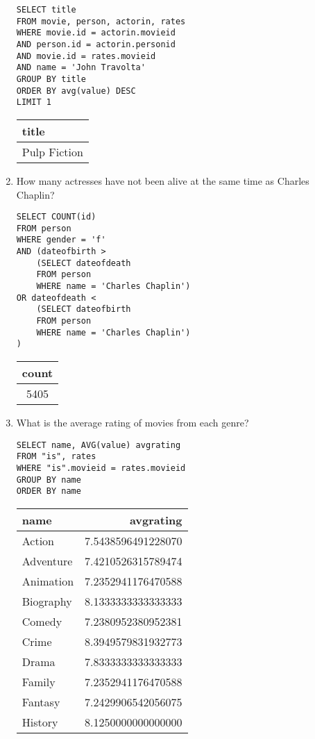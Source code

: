 \begin{enumerate}
\begin{lstlisting}
SELECT title
FROM movie, person, actorin, rates
WHERE movie.id = actorin.movieid
AND person.id = actorin.personid
AND movie.id = rates.movieid
AND name = 'John Travolta'
GROUP BY title
ORDER BY avg(value) DESC
LIMIT 1
\end{lstlisting}

\begin{tabular}{|l|}
\hline
title \\ \hline
Pulp Fiction \\ \hline
\end{tabular}

\item How many actresses have not been alive at the same time as Charles Chaplin?

\begin{lstlisting}
SELECT COUNT(id)
FROM person
WHERE gender = 'f'
AND (dateofbirth > 
	(SELECT dateofdeath
	FROM person
	WHERE name = 'Charles Chaplin')
OR dateofdeath <
	(SELECT dateofbirth
	FROM person
	WHERE name = 'Charles Chaplin')
)
\end{lstlisting}

\begin{tabular}{|c|}
\hline
count \\ \hline
5405 \\ \hline
\end{tabular}

\item What is the average rating of movies from each genre?

\begin{lstlisting}
SELECT name, AVG(value) avgrating
FROM "is", rates
WHERE "is".movieid = rates.movieid
GROUP BY name
ORDER BY name
\end{lstlisting}

\begin{tabular}{|l|r|}
\hline
name & avgrating \\ \hline
Action & 7.5438596491228070 \\ \hline
Adventure & 7.4210526315789474 \\ \hline
Animation & 7.2352941176470588 \\ \hline
Biography & 8.1333333333333333 \\ \hline
Comedy & 7.2380952380952381 \\ \hline
Crime & 8.3949579831932773 \\ \hline
Drama & 7.8333333333333333 \\ \hline
Family & 7.2352941176470588 \\ \hline
Fantasy & 7.2429906542056075 \\ \hline
History & 8.1250000000000000 \\ \hline
\end{tabular}


\end{enumerate}
